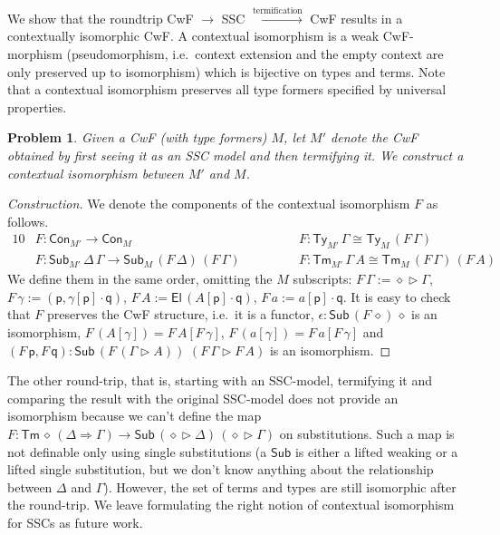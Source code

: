 \documentclass[submission,copyright,creativecommons]{eptcs}
\newtheorem{problem}[theorem]{Problem}
\newcommand{\ra}{\rightarrow}
\newcommand{\Ra}{\Rightarrow}
\newcommand{\Ty}{\mathsf{Ty}}
\newcommand{\Tm}{\mathsf{Tm}}
\newcommand{\Con}{\mathsf{Con}}
\newcommand{\Sub}{\mathsf{Sub}}
\newcommand{\p}{\mathsf{p}}
\newcommand{\q}{\mathsf{q}}
\newcommand{\ext}{\mathop{\triangleright}}
\newcommand{\U}{\mathsf{U}}
\newcommand{\El}{\mathsf{El}}
\begin{document}
We show that the roundtrip CwF $\longrightarrow$ SSC
$\xrightarrow{\text{termification}}$ CwF results in a contextually
isomorphic CwF. A contextual isomorphism
\cite{DBLP:journals/corr/abs-2211-07487} is a weak CwF-morphism
(pseudomorphism, i.e.\ context extension and the empty context are
only preserved up to isomorphism) which is bijective on types and
terms. Note that a contextual isomorphism preserves all type formers
specified by universal properties.
\begin{problem}
  Given a CwF (with type formers) $M$, let $M'$ denote the CwF
  obtained by first seeing it as an SSC model and then termifying it. We
  construct a contextual isomorphism between $M'$ and $M$.
\end{problem}
\begin{proof}[Construction]
  We denote the components of the contextual isomorphism $F$ as follows.
  \begin{alignat*}{10}
    & F : \Con_{M'}\ra\Con_M && F : \Ty_{M'}\,\Gamma \cong \Ty_M\,(F\,\Gamma) \\
    & F : \Sub_{M'}\,\Delta\,\Gamma\ra\Sub_M\,(F\,\Delta)\,(F\,\Gamma)\hspace{3em} && F : \Tm_{M'}\,\Gamma\,A \cong \Tm_M\,(F\,\Gamma)\,(F\,A)
  \end{alignat*}
  We define them in the same order, omitting the $M$ subscripts:
  $F\,\Gamma := \diamond\ext\Gamma$, 
  $F\,\gamma := (\p,\gamma[\p]\cdot\q)$, 
  $F\,A := \El\,(A[\p]\cdot\q)$, 
  $F\,a := a[\p]\cdot\q$.
  It is easy to check that $F$ preserves the CwF structure, i.e.\ it
  is a functor, $\epsilon : \Sub\,(F\,\diamond)\,\diamond$ is an
  isomorphism, $F\,(A[\gamma]) = F\,A[F\,\gamma]$, $F\,(a[\gamma]) =
  F\,a[F\,\gamma]$ and $(F\,\p,F\,\q) : \Sub\,(F\,(\Gamma\ext
  A))$ $(F\,\Gamma\ext F\,A)$ is an isomorphism. %
\end{proof}
The other round-trip, that is, starting with an SSC-model, termifying
it and comparing the result with the original SSC-model does not provide an
isomorphism because we can't define the map $F :
\Tm\,\diamond\,(\Delta\Ra\Gamma) \ra
\Sub\,(\diamond\ext\Delta)\,(\diamond\ext\Gamma)$ on
substitutions. Such a map is not definable only using single
substitutions (a $\Sub$ is either a lifted weaking or a lifted single substitution, but we don't know anything about the relationship between $\Delta$ and $\Gamma$). However, the set of terms and types are still
isomorphic after the round-trip. We leave formulating the right notion
of contextual isomorphism for SSCs as future work.
\end{document}
